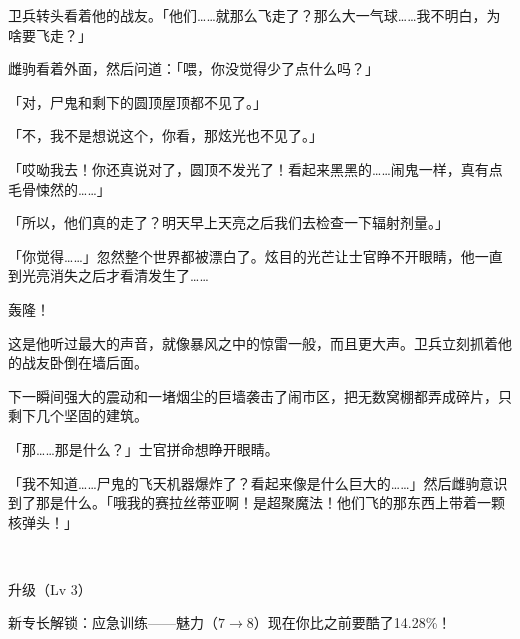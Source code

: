 卫兵转头看着他的战友。「他们……就那么飞走了？那么大一气球……我不明白，为啥要飞走？」

雌驹看着外面，然后问道：「喂，你没觉得少了点什么吗？」

「对，尸鬼和剩下的圆顶屋顶都不见了。」

「不，我不是想说这个，你看，那炫光也不见了。」

「哎呦我去！你还真说对了，圆顶不发光了！看起来黑黑的……闹鬼一样，真有点毛骨悚然的……」

「所以，他们真的走了？明天早上天亮之后我们去检查一下辐射剂量。」

「你觉得……」忽然整个世界都被漂白了。炫目的光芒让士官睁不开眼睛，他一直到光亮消失之后才看清发生了……

轰隆！

这是他听过最大的声音，就像暴风之中的惊雷一般，而且更大声。卫兵立刻抓着他的战友卧倒在墙后面。

下一瞬间强大的震动和一堵烟尘的巨墙袭击了闹市区，把无数窝棚都弄成碎片，只剩下几个坚固的建筑。

「那……那是什么？」士官拼命想睁开眼睛。

「我不知道……尸鬼的飞天机器爆炸了？看起来像是什么巨大的……」然后雌驹意识到了那是什么。「哦我的赛拉丝蒂亚啊！是超聚魔法！他们飞的那东西上带着一颗核弹头！」

~\vfill

\begin{note}
    升级（Lv 3）

    新专长解锁：应急训练——魅力（$7 \to 8$）现在你比之前要酷了14.28\%！
\end{note}


